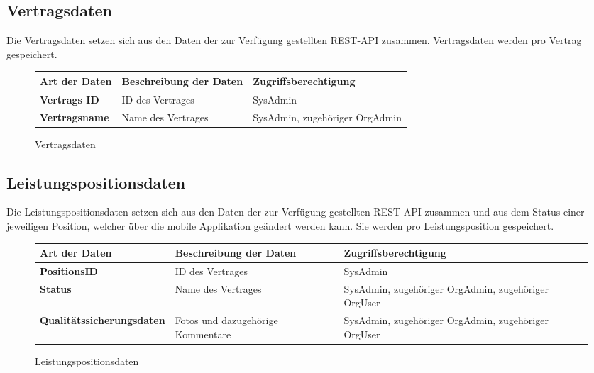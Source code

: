 \subsection{Vertragsdaten}

Die Vertragsdaten setzen sich aus den Daten der zur Verf\"ugung gestellten REST-API zusammen. Vertragsdaten werden pro Vertrag gespeichert.

\begin{figure}[h]
	\centering
	\begin{tabularx}{\textwidth}{| X || X | X |}
        \hline
		\textbf{Art der Daten} & \textbf{Beschreibung der Daten} & \textbf{Zugriffsberechtigung} \\ \hline \hline
		\textbf{Vertrags ID} & ID des Vertrages & SysAdmin \\ \hline
		\textbf{Vertragsname} & Name des Vertrages & SysAdmin, zugehöriger OrgAdmin \\ \hline
	\end{tabularx}
	\caption{Vertragsdaten}
	\label{fig:Vertragsdaten}
\end{figure}

\newpage

\subsection{Leistungspositionsdaten}

Die Leistungspositionsdaten setzen sich aus den Daten der zur Verf\"ugung gestellten REST-API zusammen und aus dem Status einer jeweiligen Position, welcher über die mobile Applikation geändert werden kann.
Sie werden pro Leistungsposition gespeichert.

\begin{figure}[h]
	\centering
	\begin{tabularx}{\textwidth}{| X || X | X |}
        \hline
		\textbf{Art der Daten} & \textbf{Beschreibung der Daten} & \textbf{Zugriffsberechtigung} \\ \hline \hline
		\textbf{PositionsID} & ID des Vertrages & SysAdmin \\ \hline
		\textbf{Status} & Name des Vertrages & SysAdmin, zugehöriger OrgAdmin, zugehöriger OrgUser \\ \hline
		\textbf{Qualitätssicherungsdaten} & Fotos und dazugehörige Kommentare & SysAdmin, zugehöriger OrgAdmin, zugehöriger OrgUser \\ \hline
	\end{tabularx}
	\caption{Leistungspositionsdaten}
	\label{fig:Leistungspositionsdaten}
\end{figure}
